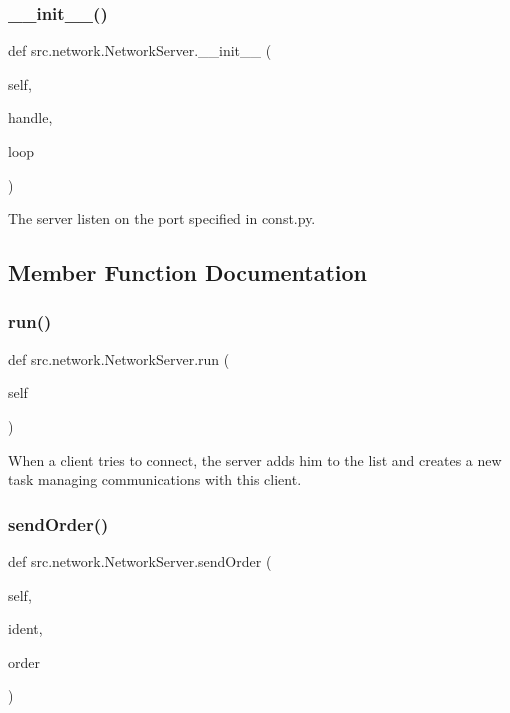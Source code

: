 \subsubsection{\texorpdfstring{\+\_\+\+\_\+init\+\_\+\+\_\+()}{\_\_init\_\_()}}
{\footnotesize\ttfamily def src.\+network.\+Network\+Server.\+\_\+\+\_\+init\+\_\+\+\_\+ (\begin{DoxyParamCaption}\item[{}]{self,  }\item[{}]{handle,  }\item[{}]{loop }\end{DoxyParamCaption})}

\begin{DoxyVerb}The server listen on the port specified in const.py. \end{DoxyVerb}
 

\subsection{Member Function Documentation}
\hypertarget{classsrc_1_1network_1_1_network_server_af8c0e34bf4a8b77b6955ca02088686cb}{}\label{classsrc_1_1network_1_1_network_server_af8c0e34bf4a8b77b6955ca02088686cb} 
\subsubsection{\texorpdfstring{run()}{run()}}
{\footnotesize\ttfamily def src.\+network.\+Network\+Server.\+run (\begin{DoxyParamCaption}\item[{}]{self }\end{DoxyParamCaption})}

\begin{DoxyVerb}When a client tries to connect, the server adds him to the list and
creates a new task managing communications with this client.
\end{DoxyVerb}
 \hypertarget{classsrc_1_1network_1_1_network_server_a3aad105410950059cea094586b40767a}{}\label{classsrc_1_1network_1_1_network_server_a3aad105410950059cea094586b40767a} 
\subsubsection{\texorpdfstring{send\+Order()}{sendOrder()}}
{\footnotesize\ttfamily def src.\+network.\+Network\+Server.\+send\+Order (\begin{DoxyParamCaption}\item[{}]{self,  }\item[{}]{ident,  }\item[{}]{order }\end{DoxyParamCaption})}

